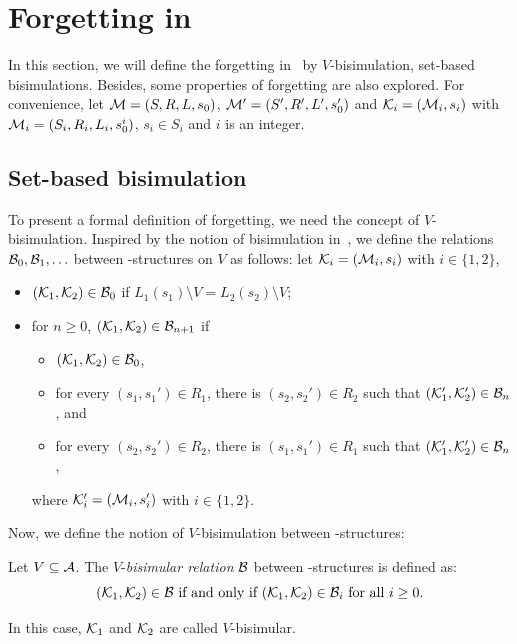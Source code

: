 \documentclass{article}
\begin{document}
\section{Forgetting in \CTL}
In this section, we will define the forgetting in \CTL\ by $V$-bisimulation, set-based bisimulations.
Besides, some properties of forgetting are also explored.
For convenience, let ${\cal M}=(S, R, L, s_0)$, ${\cal M}'=(S',R',L',s_0')$ and ${\cal K}_i=({\cal M}_i, s_i)$ with ${\cal M}_i=(S_i, R_i,L_i, s_0^i)$, $s_i \in S_i$ and $i$ is an integer.
\subsection{Set-based bisimulation}
To present a formal definition of forgetting, we need the concept of $V$-bisimulation.
Inspired by the notion of bisimulation in~\cite{DBLP:journals/tcs/BrowneCG88}, we define the relations ${\cal B}_0,{\cal B}_1,\ldots$
between \MPK-structures on $V$ as follows: let
${\cal K}_i=({\cal M}_i,s_i)$ with $i\in\{1,2\}$,
\begin{itemize}
  \item $({\cal K}_1,{\cal K}_2)\in{\cal B}_0$ if $L_1(s_1)\setminus V=L_2(s_2)\setminus V$;  %
  \item for $n\ge 0$, $({\cal K}_1,{\cal K}_2)\in{\cal B}_{n+1}$ if
  \begin{itemize}
    \item $({\cal K}_1,{\cal K}_2)\in{\cal B}_0$,
    \item for every $(s_1,s_1')\in R_1$, there is $(s_2,s_2')\in R_2$
    such that $({\cal K}_1',{\cal K}_2')\in {\cal B}_n$, and
    \item for every $(s_2,s_2')\in R_2$, there is $(s_1,s_1')\in R_1$
    such that $({\cal K}_1',{\cal K}_2')\in {\cal B}_n$,
  \end{itemize}
  where ${\cal K}_i'=({\cal M}_i,s_i')$ with $i\in\{1,2\}$.
\end{itemize}

Now, we define the notion of $V$-bisimulation between \MPK-structures:
\begin{definition}[$V$-bisimulation]
  \label{def:V-bisimulation}
   Let $V\subseteq\cal A$. The $V$-{\em bisimular relation} ${\cal B}$ between
   \MPK-structures is defined as:
  \[({\cal K}_1,{\cal K}_2)\in {\cal B}\mbox{ if and only if } ({\cal K}_1,{\cal K}_2)\in {{\cal B}_i}\mbox{ for all }i\ge 0.\]
\end{definition}
In this case, ${\cal K}_1$ and ${\cal K}_2$ are called $V$-bisimular.
\end{document}

